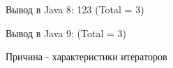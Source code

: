 \begin{frame}
\frametitle{\insertsection} 
\framesubtitle{\insertsubsection}
\inputminted{java}{code/Spliterator-props.java}
Вывод в Java 8: 123 (Total = 3)

Вывод в Java 9: (Total = 3)

Причина - характеристики итераторов
\end{frame}
